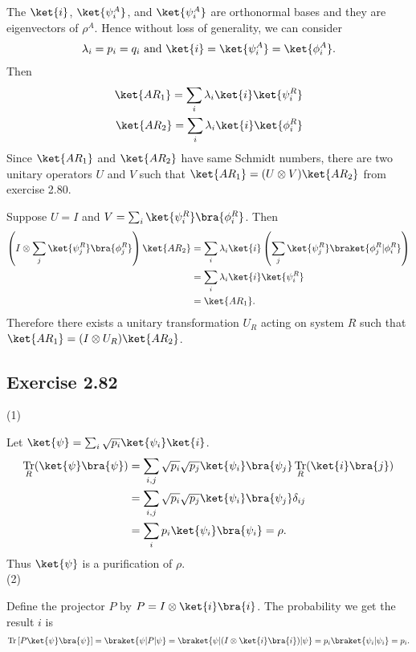 \documentclass[a4paper,12pt]{article}
\DeclareMathOperator{\Tr}{Tr}
\begin{document}
The $\ket{i}$, $\ket{\psi_i^A}$, and $\ket{\psi_i^A}$ are orthonormal bases and they are eigenvectors of $\rho^A$.
Hence without loss of generality, we can consider
\begin{align*}
    \lambda_i = p_i = q_i \text{ and } \ket{i} = \ket{\psi_i^A} = \ket{\phi_i^A}.
\end{align*}
%
Then
\begin{align*}
    \ket{AR_1} = \sum_i \lambda_i \ket{i} \ket{\psi_i^R}\\
    \ket{AR_2} = \sum_i \lambda_i \ket{i} \ket{\phi_i^R}
\end{align*}
Since $\ket{AR_1}$ and $\ket{AR_2}$ have same Schmidt numbers, there are two unitary operators $U$ and $V$ such that
$\ket{AR_1} = (U \otimes V) \ket{AR_2}$ from exercise 2.80.

Suppose $U = I$ and $V = \sum_i\ket{\psi_i^R}\bra{\phi_i^R}$.
Then
\begin{align*}
    \left(I \otimes \sum_j \ket{\psi_j^R}\bra{\phi_j^R} \right) \ket{AR_2} &= \sum_i \lambda_i \ket{i} \left( \sum_j \ket{\psi_j^R} \braket{\phi_j^R | \phi_i^R} \right)\\
                                                           &= \sum_i \lambda_i \ket{i} \ket{\psi_i^R}\\
                                                           &= \ket{AR_1}.
\end{align*}
%
Therefore there exists a unitary transformation $U_R$ acting on system $R$ such that $\ket{AR_1} = (I \otimes U_R) \ket{AR_2}$.


\subsection*{Exercise 2.82}
(1)

Let $\ket{\psi} = \sum_i \sqrt{p_i} \ket{\psi_i} \ket{i}$.
\begin{align*}
    \Tr_R (\ket{\psi}\bra{\psi})
        &= \sum_{i,j} \sqrt{p_i} \sqrt{p_j} \ket{\psi_i}\bra{\psi_j} \Tr_R (\ket{i}\bra{j})\\
        &= \sum_{i,j} \sqrt{p_i} \sqrt{p_j} \ket{\psi_i}\bra{\psi_j} \delta_{ij}\\
        &= \sum_i p_i \ket{\psi_i}\bra{\psi_i} = \rho.
\end{align*}
Thus $\ket{\psi}$ is a purification of $\rho$.\\
(2)

Define the projector $P$ by $P = I \otimes \ket{i}\bra{i}$.
The probability we get the result $i$ is
\begin{align*}
    \Tr \left[ P \ket{\psi}\bra{\psi}\right] = \braket{\psi | P | \psi} = \braket{\psi | (I \otimes \ket{i}\bra{i}) | \psi} = p_i \braket{\psi_i | \psi_i} = p_i.
\end{align*}
\end{document}
